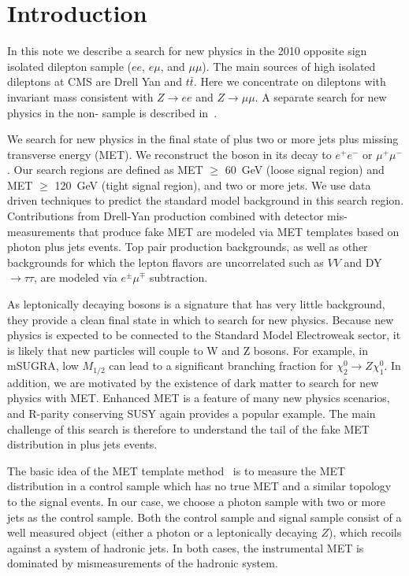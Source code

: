 
\section{Introduction}

In this note we describe a search for new physics in the 2010 
opposite sign isolated dilepton sample ($ee$, $e\mu$, and $\mu\mu$).  
The main sources of high \pt isolated dileptons at CMS are Drell Yan and $t\bar{t}$.
Here we concentrate on dileptons with invariant mass consistent
with $Z \to ee$ and $Z \to \mu\mu$.  A separate search for new physics in the non-\Z
sample is described in~\cite{ref:GenericOS}.

We search for new physics in the final state of \Z plus two or more jets plus missing transverse energy (MET). We reconstruct the \Z boson
in its decay to $e^+e^-$ or $\mu^+\mu^-$. Our search regions are defined as MET $\ge$ 60~GeV (loose signal region) and MET $\ge$ 120~GeV (tight signal region), and two or more jets. We use data driven techniques to predict the
standard model background in this search region. 
Contributions from Drell-Yan production combined with detector mis-measurements that produce fake MET are modeled via MET templates based on photon plus jets events. 
Top pair production backgrounds, as well as other backgrounds for which the lepton
flavors are uncorrelated such as $VV$ and DY$\rightarrow\tau\tau$, are modeled via $e^\pm\mu^\mp$ subtraction.

As leptonically decaying \Z bosons is a signature that has very little background, they provide a clean final state in which to search for new physics. 
Because new physics is expected to be connected to the Standard Model Electroweak sector, it is likely that new particles will couple to W and Z bosons. 
For example, in mSUGRA, low $M_{1/2}$ can lead to a significant branching fraction for $\chi_2^0 \rightarrow Z \chi_1^0$. 
In addition, we are motivated by the existence of dark matter to search for new physics with MET.
Enhanced MET is a feature of many new physics scenarios, and R-parity conserving SUSY again provides a popular example. The main challenge of this search is therefore to 
understand the tail of the fake MET distribution in \Z plus jets events.

The basic idea of the MET template method~\cite{ref:templates1}\cite{ref:templates2} is to measure the MET distribution in a control sample which has no true MET and a similar topology to the signal events. 
In our case, we choose a photon sample with two or more jets as the control sample.
Both the control sample and signal sample consist of a well measured object (either a photon or a leptonically decaying $Z$), which recoils against a system of hadronic jets. 
In both cases, the instrumental MET is dominated by mismeasurements of the hadronic system. 

